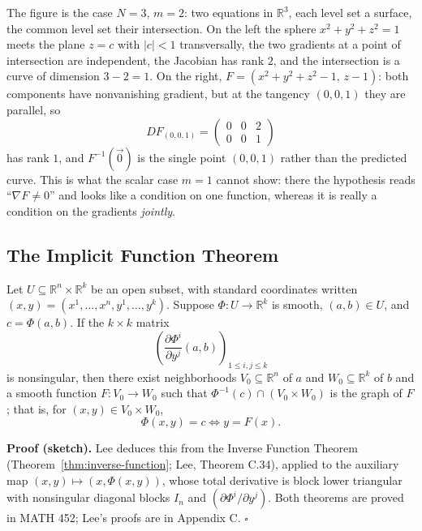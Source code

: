 \documentclass[11pt]{report}
\makeatletter
\newcounter{thmcounter}[section]
\renewenvironment{proof}[1][Proof]{\noindent\textbf{#1.} }{\hfill$\square$\par\vspace{5pt}}
\newcommand{\thmlabel}[1]{\edef\@currentlabel{\arabic{section}.\arabic{thmcounter}}\label{#1}}
\newcommand{\leeref}[1]{\par\smallskip{\raggedleft\footnotesize\textsc{Lee}:\ #1\par}}
\makeatother
\begin{document}
The figure is the case $N = 3$, $m = 2$: two equations in $\mathbb{R}^3$, each level set a surface, the common level set their intersection. On the left the sphere $x^2+y^2+z^2 = 1$ meets the plane $z = c$ with $|c| < 1$ transversally, the two gradients at a point of intersection are independent, the Jacobian has rank $2$, and the intersection is a curve of dimension $3 - 2 = 1$. On the right, $F = (x^2+y^2+z^2-1,\, z-1)$: both components have nonvanishing gradient, but at the tangency $(0,0,1)$ they are parallel, so
\[
DF_{(0,0,1)} = \begin{pmatrix} 0 & 0 & 2 \\ 0 & 0 & 1 \end{pmatrix}
\]
has rank $1$, and $F^{-1}(\vec 0)$ is the single point $(0,0,1)$ rather than the predicted curve. This is what the scalar case $m = 1$ cannot show: there the hypothesis reads ``$\nabla F \neq 0$'' and looks like a condition on one function, whereas it is really a condition on the gradients \emph{jointly}.


\subsection{The Implicit Function Theorem}\label{sub:ift}

\begin{thmbox}\thmlabel{thm:ift-general}
Let $U \subseteq \mathbb{R}^n \times \mathbb{R}^k$ be an open subset, with standard coordinates written $(x, y) = (x^1, \ldots, x^n, y^1, \ldots, y^k)$. Suppose $\Phi : U \to \mathbb{R}^k$ is smooth, $(a, b) \in U$, and $c = \Phi(a,b)$. If the $k \times k$ matrix
\[
\left( \frac{\partial \Phi^i}{\partial y^j}(a, b) \right)_{1 \le i, j \le k}
\]
is nonsingular, then there exist neighborhoods $V_0 \subseteq \mathbb{R}^n$ of $a$ and $W_0 \subseteq \mathbb{R}^k$ of $b$ and a smooth function $F : V_0 \to W_0$ such that $\Phi^{-1}(c) \cap (V_0 \times W_0)$ is the graph of $F$; that is, for $(x,y) \in V_0 \times W_0$,
\[
\Phi(x, y) = c \iff y = F(x).
\]
\leeref{Theorem C.40}
\end{thmbox}

\begin{proof}[Proof (sketch)]
Lee deduces this from the Inverse Function Theorem (Theorem~\ref{thm:inverse-function}; Lee, Theorem C.34), applied to the auxiliary map $(x,y) \mapsto (x, \Phi(x,y))$, whose total derivative is block lower triangular with nonsingular diagonal blocks $I_n$ and $(\partial\Phi^i/\partial y^j)$. Both theorems are proved in MATH 452; Lee's proofs are in Appendix C.
\end{proof}
\end{document}
